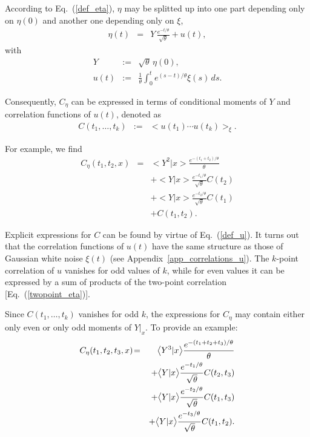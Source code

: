 \documentclass[aps,twocolumn,superscriptaddress,showpacs,showkeys]{revtex4}
\begin{document}
\noindent According to Eq.~(\ref{def_eta}), $\eta$ may be splitted up into one part depending only on $\eta(0)$ and
another one depending only on $\xi$,
%
\begin{eqnarray}\label{split_eta}
\eta(t) &=& Y\,\frac{e^{-t/\theta}}{\sqrt{\theta}}+u(t),
\end{eqnarray}
\noindent with
%
\begin{eqnarray}\label{def_Y}
Y &:=& \sqrt{\theta}\,\eta(0),\\
\label{def_u}
u(t) &:=& \frac{1}{\theta} \int_{0}^t e^{(s-t)/\theta}\xi(s)\,ds.
\end{eqnarray}

\noindent Consequently, $C_\eta$ can be expressed in terms of conditional moments of
$Y$ and correlation functions of $u(t)$, denoted as
%
\begin{eqnarray}\label{def_C}
C(t_1,\ldots,t_k) &:=& \big<u(t_1)\cdots u(t_k)\big>_\xi.
\end{eqnarray}

\noindent For example, we find
%
\begin{eqnarray}
C_\eta(t_1,t_2,x) \!&=&
\big<Y^2|x\big>\frac{e^{-(t_1+t_2)/\theta}}{\theta}\nonumber\\
   \!&&+\big<Y|x\big>\frac{e^{-t_1/\theta}}{\sqrt{\theta}}C(t_2)\nonumber\\
   \!&&+\big<Y|x\big>\frac{e^{-t_2/\theta}}{\sqrt{\theta}}C(t_1)\nonumber\\
   \!&&+C(t_1,t_2).
\end{eqnarray}

\noindent Explicit expressions for $C$ can be found by virtue of Eq.~(\ref{def_u}). It turns out that the correlation
functions of $u(t)$ have the same structure as those of Gaussian white noise $\xi(t)$ (see Appendix~\ref{app_correlations_u}).
The $k$-point correlation of $u$ vanishes for odd values of $k$, while for even values it can be expressed by a sum
of products of the two-point correlation [Eq.~(\ref{twopoint_eta})].

Since $C(t_1,\ldots,t_k)$ vanishes for odd $k$, the expressions for $C_\eta$ may contain either only even or only odd
moments of $Y\big|_x$. To provide an example:
%
\begin{eqnarray}
C_\eta(t_1,t_2,t_3,x) \!&=&
\big<Y^3|x\big>\frac{e^{-(t_1+t_2+t_3)/\theta}}{\theta}\cr
   \!&&+\big<Y|x\big>\frac{e^{-t_1/\theta}}{\sqrt{\theta}}C(t_2,t_3)\cr
   \!&&+\big<Y|x\big>\frac{e^{-t_2/\theta}}{\sqrt{\theta}}C(t_1,t_3)\cr
   \!&&+\big<Y|x\big>\frac{e^{-t_3/\theta}}{\sqrt{\theta}}C(t_1,t_2).
\end{eqnarray}
\end{document}
